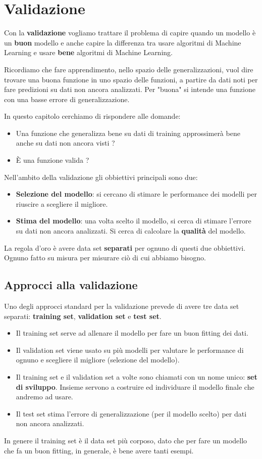 \chapter{Validazione}
Con la \textbf{validazione} vogliamo trattare il problema di capire quando un modello \`e un \textbf{buon} modello e
anche capire la differenza tra usare algoritmi di Machine Learning e usare \textbf{bene} algoritmi di Machine Learning.

Ricordiamo che fare apprendimento, nello spazio delle generalizzazioni, vuol dire trovare una buona funzione in uno
spazio delle funzioni, a partire da dati noti per fare predizioni su dati non ancora analizzati. Per "buona" si intende
una funzione con una basse errore di generalizzazione.

In questo capitolo cerchiamo di rispondere alle domande:
\begin{itemize}
	\item Una funzione che generalizza bene su dati di training approssimer\`a bene anche su dati non ancora visti ?
	\item \`E una funzione valida ?
\end{itemize}

Nell'ambito della validazione gli obbiettivi principali sono due:
\begin{itemize}
	\item \textbf{Selezione del modello}: si cercano di stimare le performance dei modelli per riuscire a scegliere il
	      migliore.
	\item \textbf{Stima del modello}: una volta scelto il modello, si cerca di stimare l'errore su dati non ancora
	      analizzati. Si cerca di calcolare la \textbf{qualit\`a} del modello.
\end{itemize}
La regola d'oro \`e avere data set \textbf{separati} per ognuno di questi due obbiettivi. Ognuno fatto su misura per
misurare ci\`o di cui abbiamo bisogno.

\section{Approcci alla validazione}
Uno degli approcci standard per la validazione prevede di avere tre data set separati: \textbf{training set},
\textbf{validation set} e \textbf{test set}.
\begin{itemize}
	\item Il training set serve ad allenare il modello per fare un buon fitting dei dati.
	\item Il validation set viene usato su pi\`u modelli per valutare le performance di ognuno e scegliere il migliore
	      (selezione del modello).
	\item Il training set e il validation set a volte sono chiamati con un nome unico: \textbf{set di sviluppo}. Insieme
	      servono a costruire ed individuare il modello finale che andremo ad usare.
	\item Il test set stima l'errore di generalizzazione (per il modello scelto) per dati non ancora analizzati.
\end{itemize}
In genere il training set \`e il data set pi\`u corposo, dato che per fare un modello che fa un buon fitting, in generale,
\`e bene avere tanti esempi.

